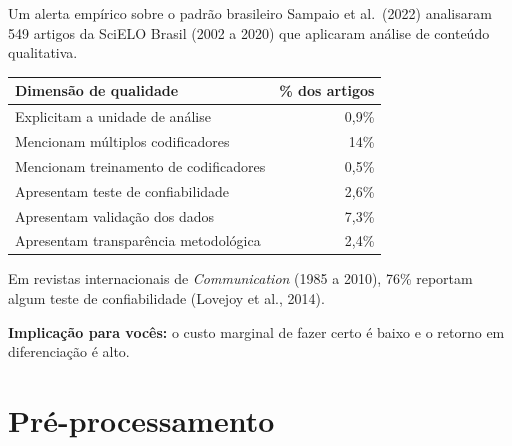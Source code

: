 \documentclass[11pt,aspectratio=169]{beamer}
\begin{document}
\begin{frame}{Um alerta empírico sobre o padrão brasileiro}
Sampaio et al.\ (2022) analisaram 549 artigos da SciELO Brasil (2002 a 2020) que
aplicaram análise de conteúdo qualitativa.
\vspace{0.15cm}
\begin{table}
\small
\centering
\begin{tabular}{lr}
\toprule
\textbf{Dimensão de qualidade} & \textbf{\% dos artigos} \\
\midrule
Explicitam a unidade de análise & 0,9\% \\
Mencionam múltiplos codificadores & 14\% \\
Mencionam treinamento de codificadores & 0,5\% \\
Apresentam teste de confiabilidade & 2,6\% \\
Apresentam validação dos dados & 7,3\% \\
Apresentam transparência metodológica & 2,4\% \\
\bottomrule
\end{tabular}
\end{table}
\vspace{0.15cm}
\footnotesize Em revistas internacionais de \emph{Communication} (1985 a 2010),
76\% reportam algum teste de confiabilidade (Lovejoy et al., 2014).
\pause

\small \textbf{Implicação para vocês:} o custo marginal de fazer certo é baixo e
o retorno em diferenciação é alto.
\end{frame}

\section{Pré-processamento}
\end{document}
